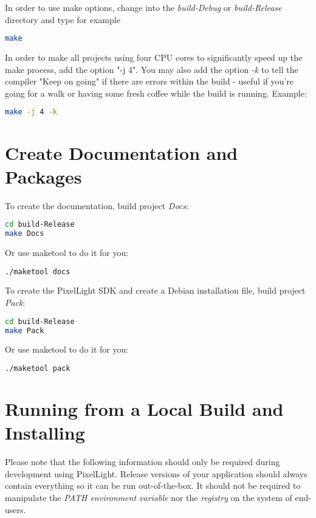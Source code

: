 In order to use make options, change into the \emph{build-Debug} or \emph{build-Release} directory and type for example
\begin{lstlisting}[language=sh]
make
\end{lstlisting}
In order to make all projects using four \ac{CPU} cores to significantly speed up the make process, add the option "-j 4". You may also add the option \emph{-k} to tell the compiler "Keep on going" if there are errors within the build - useful if you're going for a walk or having some fresh coffee while the build is running. Example:
\begin{lstlisting}[language=sh]
make -j 4 -k
\end{lstlisting}




\section{Create Documentation and Packages}
To create the documentation, build project \emph{Docs}:
\begin{lstlisting}[language=sh]
cd build-Release
make Docs
\end{lstlisting}

Or use maketool to do it for you:
\begin{lstlisting}[language=sh]
./maketool docs
\end{lstlisting}

To create the PixelLight \ac{SDK} and create a Debian installation file, build project \emph{Pack}:
\begin{lstlisting}[language=sh]
cd build-Release
make Pack
\end{lstlisting}

Or use maketool to do it for you:
\begin{lstlisting}[language=sh]
./maketool pack
\end{lstlisting}




\section{Running from a Local Build and Installing}
Please note that the following information should only be required during development using PixelLight. Release versions of your application should always contain everything so it can be run out-of-the-box. It should not be required to manipulate the \emph{PATH environment variable} nor the \emph{registry} on the system of end-users.

